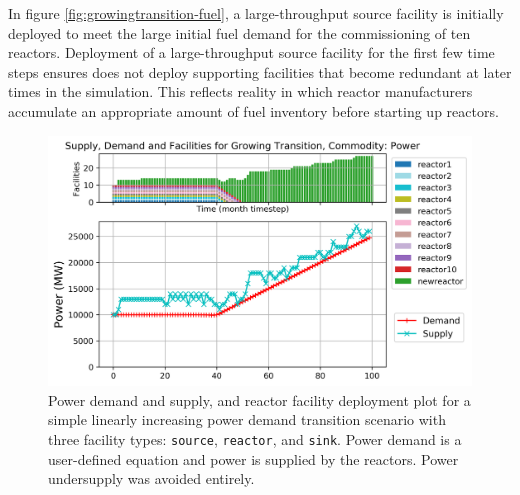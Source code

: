 In figure \ref{fig:growingtransition-fuel},
a large-throughput source facility is initially
deployed to meet the large initial fuel demand for the commissioning 
of ten reactors. 
Deployment of a large-throughput source facility for the 
first few time steps ensures \deploy does not deploy supporting
facilities that become redundant at later times in  
the simulation.
This reflects reality in which reactor manufacturers accumulate
an appropriate amount of fuel inventory before starting 
up reactors. 

\begin{figure}[]
    \centering
    \includegraphics[width=\linewidth]{figures/growingtransition-power.png} 
        \caption{Power demand and supply, and reactor facility deployment plot for  
        a simple linearly increasing power demand transition scenario with 
        three facility types: \texttt{source}, \texttt{reactor}, and \texttt{sink}.
        Power demand is a user-defined equation and power is supplied by the reactors.
        Power undersupply was avoided entirely.}
        \label{fig:growingtransition-power}
\end{figure}

